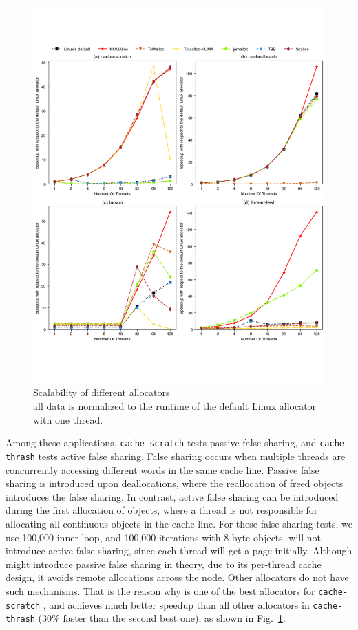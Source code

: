  
\begin{figure}[!ht]
    \centering
    \includegraphics[width=\textwidth]{figure/sythentic-scalobility.pdf}
    \caption{Scalability of different allocators\\  all data is normalized to the runtime of the default Linux allocator with one thread.}
    \label{sythentic-scalability}
\end{figure}

Among these applications, \texttt{cache-scratch} tests passive false sharing, and \texttt{cache-thrash} tests active false sharing. False sharing occurs when multiple threads are concurrently accessing different words in the same cache line. 
Passive false sharing is introduced upon deallocations, where the reallocation of freed objects introduces the false sharing. In contrast, active false sharing can be introduced during the first allocation of objects, where a thread is not responsible for allocating all continuous objects in the cache line. For these false sharing tests, we use 100,000 inner-loop, and 100,000 iterations with 8-byte objects. \NM{} will not introduce active false sharing, since each thread will get a page initially. 
 Although \NM{} might introduce passive false sharing in theory, due to its per-thread cache design, it avoids remote allocations across the node. Other allocators do not have such mechanisms. That is the reason why \NM{} is one of the best allocators for
 \texttt{cache-scratch} , and achieves much better speedup than all other allocators in \texttt{cache-thrash} (30\% faster than the second best one), as shown in Fig.~\ref{sythentic-scalability}.  


